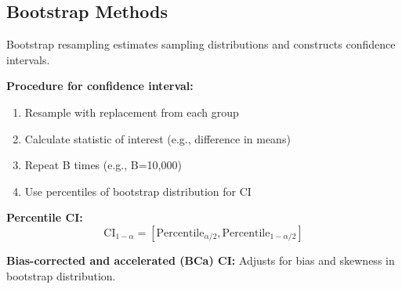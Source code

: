 \subsection{Bootstrap Methods}

Bootstrap resampling estimates sampling distributions and constructs confidence intervals.

\textbf{Procedure for confidence interval:}
\begin{enumerate}
    \item Resample with replacement from each group
    \item Calculate statistic of interest (e.g., difference in means)
    \item Repeat B times (e.g., B=10,000)
    \item Use percentiles of bootstrap distribution for CI
\end{enumerate}

\textbf{Percentile CI:}
\begin{equation}
\text{CI}_{1-\alpha} = [\text{Percentile}_{\alpha/2}, \text{Percentile}_{1-\alpha/2}]
\end{equation}

\textbf{Bias-corrected and accelerated (BCa) CI:} Adjusts for bias and skewness in bootstrap distribution.

